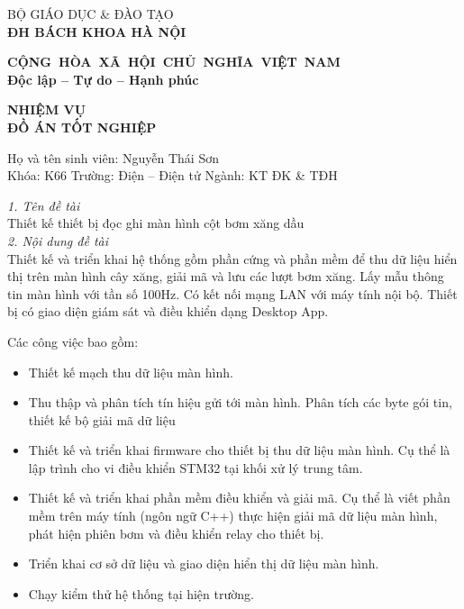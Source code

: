 \begin{multicols}{2}
\centering
\hspace{-3cm}BỘ GIÁO DỤC \& ĐÀO TẠO \\ \hspace{-3cm}\textbf{ĐH BÁCH KHOA HÀ NỘI}

\columnbreak

\hspace{-1.6cm}\textbf{CỘNG~HÒA~XÃ~HỘI~CHỦ~NGHĨA~VIỆT~NAM} \\ \hspace{-1.6cm}\textbf{Độc lập -- Tự do -- Hạnh phúc}

\end{multicols}

\begin{center}
   \textbf{NHIỆM VỤ \\ĐỒ ÁN TỐT NGHIỆP} 
\end{center}


\hspace{-1cm}Họ và tên sinh viên: Nguyễn Thái Sơn\\Khóa: K66 \hfill Trường: Điện -- Điện tử \hfill Ngành: KT ĐK \& TĐH
    
    
    \hspace{-1cm}\textit{1. Tên đề tài}\\
             Thiết kế thiết bị đọc ghi màn hình cột bơm xăng dầu  \\[0.2cm]
    \textit{2. Nội dung đề tài}\\
            Thiết kế và triển khai hệ thống gồm phần cứng và phần mềm
            để thu dữ liệu hiển thị trên màn hình cây xăng, giải mã
            và lưu các lượt bơm xăng. Lấy mẫu thông tin màn hình với tần số 100Hz. Có kết nối mạng LAN với máy tính nội bộ. Thiết bị có giao diện giám sát và điều khiển dạng Desktop App.

            Các công việc bao gồm:
            \begin{itemize}
                \item Thiết kế mạch thu dữ liệu màn hình.
                \item Thu thập và phân tích tín hiệu gửi tới màn hình. Phân tích các byte gói tin, thiết kế bộ giải mã dữ liệu
                \item Thiết kế và triển khai firmware cho thiết bị thu dữ liệu màn hình. Cụ thể là lập trình cho vi điều khiển STM32 tại khối xử lý trung tâm.
                \item Thiết kế và triển khai phần mềm điều khiển và giải mã. Cụ thể là viết phần mềm trên máy tính (ngôn ngữ C++) thực hiện giải mã dữ liệu màn hình, phát hiện phiên bơm và điều khiển relay cho thiết bị.
                \item Triển khai cơ sở dữ liệu và giao diện hiển thị dữ liệu màn hình.
                \item Chạy kiểm thử hệ thống tại hiện trường.
            \end{itemize}
           
